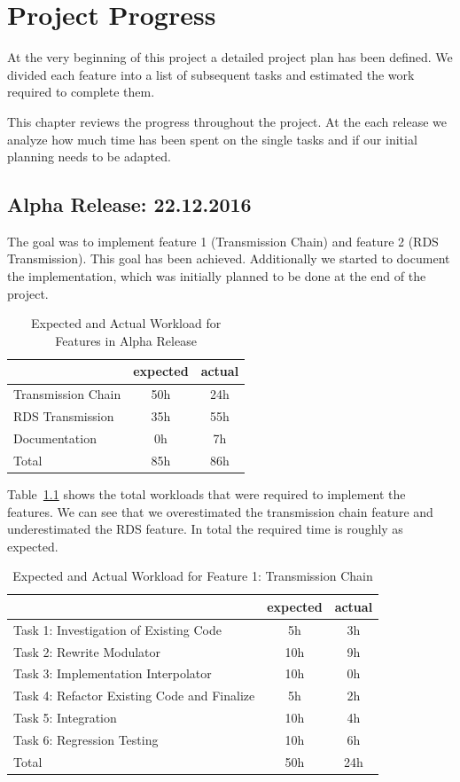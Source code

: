 
\chapter{Project Progress}

At the very beginning of this project a detailed project plan has been defined. We divided each feature into a list of subsequent tasks and estimated the work required to complete them. 

This chapter reviews the progress throughout the project. At the each release we analyze how much time has been spent on the single tasks and if our initial planning needs to be adapted.


\section{Alpha Release: 22.12.2016}

The goal was to implement feature 1 (Transmission Chain) and feature 2 (RDS Transmission). This goal has been achieved. Additionally we started to document the implementation, which was initially planned to be done at the end of the project. 

\begin{table}[!htbp]
\centering
\caption{Expected and Actual Workload for Features in Alpha Release}
\label{tab:alpha:features}
\begin{tabular}{ l | c | c }
	 & expected  & actual \\ \hline
	Transmission Chain & 50h & 24h \\  \hline
	RDS Transmission & 35h & 55h \\ \hline
	Documentation & 0h & 7h \\ \hline \hline
	Total & 85h & 86h 
\end{tabular}
\end{table}

Table~\ref{tab:alpha:features} shows the total workloads that were required to implement the features. We can see that we overestimated the transmission chain feature and underestimated the RDS feature. In total the required time is roughly as expected. 

\begin{table}[!htbp]
	\centering
	\caption{Expected and Actual Workload for Feature 1: Transmission Chain}
	\label{tab:alpha:feature1}
	\begin{tabular}{ l | c | c }
		& expected  & actual \\ \hline
		Task 1: Investigation of Existing Code & 5h & 3h \\  \hline
		Task 2: Rewrite Modulator  & 10h & 9h \\ \hline
		Task 3: Implementation Interpolator & 10h & 0h \\ \hline
		Task 4: Refactor Existing Code and Finalize & 5h& 2h  \\ \hline
		Task 5: Integration & 10h & 4h  \\ \hline
		Task 6: Regression Testing & 10h & 6h  \\ \hline \hline 
		Total & 50h & 24h 
	\end{tabular}
\end{table}

